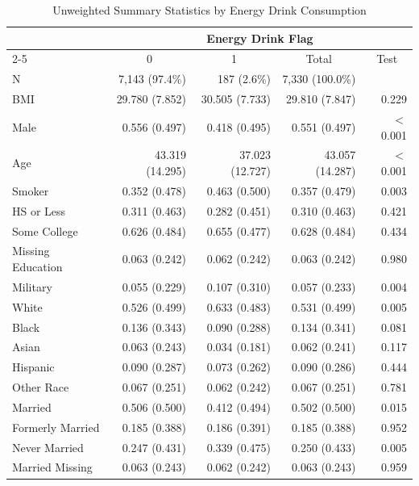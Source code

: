 \begin{table}[htbp]
\centering
\caption{Unweighted Summary Statistics by Energy Drink Consumption}
\label{tab:unweighted_summary}
\begin{tabular}{lrrrr}
\toprule
 & \multicolumn{4}{c}{Energy Drink Flag} \\
\cmidrule{2-5}
 & \multicolumn{1}{c}{0} & \multicolumn{1}{c}{1} & \multicolumn{1}{c}{Total} & \multicolumn{1}{c}{Test} \\
\midrule
N & 7,143 (97.4\%) & 187 (2.6\%) & 7,330 (100.0\%) & \\
BMI & 29.780 (7.852) & 30.505 (7.733) & 29.810 (7.847) & 0.229 \\
Male & 0.556 (0.497) & 0.418 (0.495) & 0.551 (0.497) & $<$0.001 \\
Age & 43.319 (14.295) & 37.023 (12.727) & 43.057 (14.287) & $<$0.001 \\
Smoker & 0.352 (0.478) & 0.463 (0.500) & 0.357 (0.479) & 0.003 \\
HS or Less & 0.311 (0.463) & 0.282 (0.451) & 0.310 (0.463) & 0.421 \\
Some College & 0.626 (0.484) & 0.655 (0.477) & 0.628 (0.484) & 0.434 \\
Missing Education & 0.063 (0.242) & 0.062 (0.242) & 0.063 (0.242) & 0.980 \\
Military & 0.055 (0.229) & 0.107 (0.310) & 0.057 (0.233) & 0.004 \\
White & 0.526 (0.499) & 0.633 (0.483) & 0.531 (0.499) & 0.005 \\
Black & 0.136 (0.343) & 0.090 (0.288) & 0.134 (0.341) & 0.081 \\
Asian & 0.063 (0.243) & 0.034 (0.181) & 0.062 (0.241) & 0.117 \\
Hispanic & 0.090 (0.287) & 0.073 (0.262) & 0.090 (0.286) & 0.444 \\
Other Race & 0.067 (0.251) & 0.062 (0.242) & 0.067 (0.251) & 0.781 \\
Married & 0.506 (0.500) & 0.412 (0.494) & 0.502 (0.500) & 0.015 \\
Formerly Married & 0.185 (0.388) & 0.186 (0.391) & 0.185 (0.388) & 0.952 \\
Never Married & 0.247 (0.431) & 0.339 (0.475) & 0.250 (0.433) & 0.005 \\
Married Missing & 0.063 (0.243) & 0.062 (0.242) & 0.063 (0.243) & 0.959 \\
\bottomrule
\end{tabular}
\end{table}

